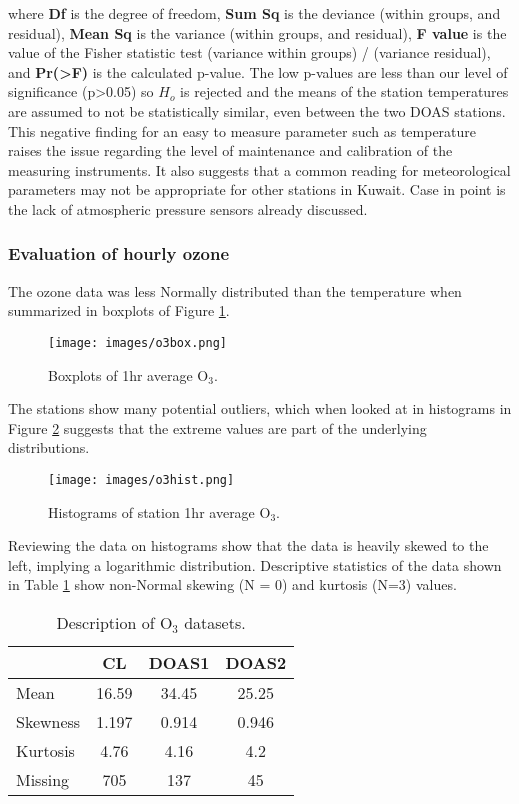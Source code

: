 \noindent
where \textbf{Df}  is the degree of freedom, \textbf{Sum Sq} is the deviance (within groups, and residual), \textbf{Mean Sq} is the  variance (within groups, and residual), \textbf{F value} is  the value of the Fisher statistic test (variance within groups) / (variance residual), and \textbf{Pr(>F)} is the calculated p-value. The low p-values are less than our level of significance (p>0.05) so  $H_{o}$ is rejected and the means of the station temperatures are assumed to not be statistically similar, even between the two DOAS stations. This negative finding for an easy to measure parameter such as temperature raises the issue regarding the level of maintenance and calibration of the measuring instruments. It also suggests that a common reading for meteorological parameters may not be appropriate for other stations in Kuwait. Case in point is the lack of atmospheric pressure sensors already discussed.  

\subsubsection{Evaluation of hourly ozone}
The ozone data was less Normally distributed than the temperature when summarized in boxplots of Figure \ref{fig:o3box}.
%
\begin{figure}[H]
\centering
\texttt{[image: images/o3box.png]} 
\caption{Boxplots of 1hr average O$_{3}$.}
\label{fig:o3box}
\end{figure}
%
The stations show many potential outliers, which when looked at in histograms in Figure \ref{fig:o3hist} suggests that the extreme values are part of the underlying distributions.

%
\begin{figure}[H]
\centering
\texttt{[image: images/o3hist.png]} 
\caption{Histograms of station 1hr average O$_{3}$.}
\label{fig:o3hist}
\end{figure}
%

Reviewing the data on histograms show that the data is heavily skewed to the left, implying a logarithmic distribution. Descriptive statistics of the data shown in Table \ref{tab:o3sets} show non-Normal skewing (N = 0) and kurtosis (N=3) values.
%
\begin{table}[H]
\centering
\caption{Description of O$_{3}$ datasets.}
\label{tab:o3sets}
\begin{tabular}{@{}lccc@{}}
\toprule
 & \textbf{CL} & \textbf{DOAS1} & \textbf{DOAS2} \\ \midrule
Mean & 16.59 & 34.45 & 25.25 \\
Skewness & 1.197 & 0.914 & 0.946 \\
Kurtosis & 4.76 & 4.16 & 4.2 \\
Missing & 705 & 137 & 45 \\ \bottomrule
\end{tabular}
\end{table}
%

